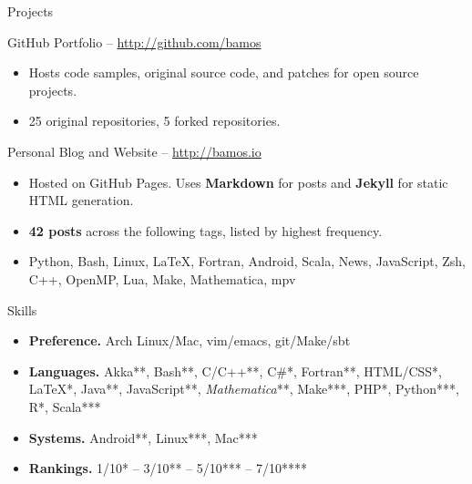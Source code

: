 \documentclass[letter]{article}
\begin{document}
    \begin{minipage}{\textwidth}
    \bigskip
  

\end{minipage}\medskip

\begin{minipage}{\textwidth}
{\huge Projects }


  
    {\large GitHub Portfolio -- \url{ http://github.com/bamos } }
    \begin{itemize}
      
        \item Hosts code samples, original source code, and patches for open source projects.
      
        \item 25 original repositories, 5 forked repositories.
      
    \end{itemize}
    \bigskip
  
    {\large Personal Blog and Website -- \url{ http://bamos.io } }
    \begin{itemize}
      
        \item Hosted on GitHub Pages. Uses {\bf Markdown} for posts and {\bf Jekyll} for static HTML generation.
      
        \item {\bf 42 posts} across the following tags, listed by highest frequency.
      
        \item Python, Bash, Linux, LaTeX, Fortran, Android, Scala, News, JavaScript, Zsh, C++, OpenMP, Lua, Make, Mathematica, mpv
      
    \end{itemize}
    \bigskip
  

\end{minipage}\medskip

\begin{minipage}{\textwidth}
{\huge Skills }


  \begin{itemize}
    
      \item { \bf Preference. } Arch Linux/Mac, vim/emacs, git/Make/sbt
    
      \item { \bf Languages. } Akka**, Bash**, C/C++**, C\#*, Fortran**, HTML/CSS*, \LaTeX**, Java**, JavaScript**, {\it Mathematica}**, Make***, PHP*, Python***, R*, Scala***
    
      \item { \bf Systems. } Android**, Linux***, Mac***
    
      \item { \bf Rankings. } 1/10* -- 3/10** -- 5/10*** -- 7/10****
    
  \end{itemize}
  \bigskip

\end{minipage}\medskip
\end{document}
